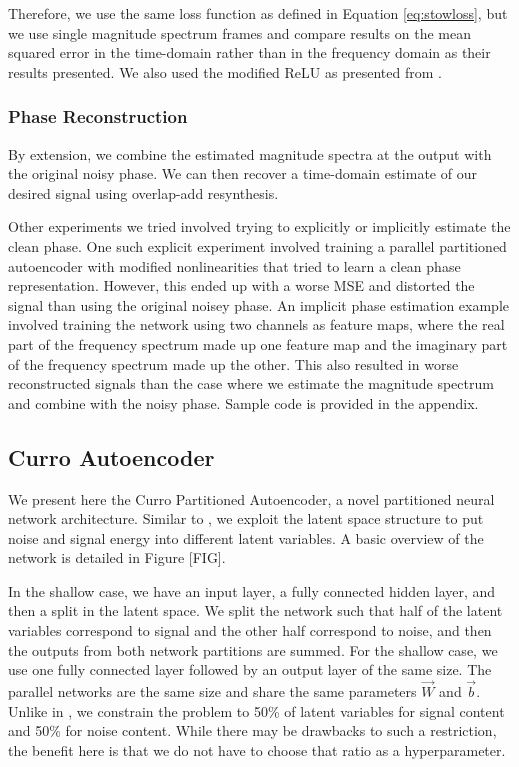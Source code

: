 Therefore, we use the same loss function as defined in Equation \ref{eq:stowloss}, but we use single magnitude spectrum frames and compare results on the mean squared error in the time-domain rather than in the frequency domain as their results presented. We also used the modified ReLU as presented from \cite{liu2014experiments}.

\subsubsection{Phase Reconstruction}

By extension, we combine the estimated magnitude spectra at the output with the original noisy phase. We can then recover a time-domain estimate of our desired signal using overlap-add resynthesis.

Other experiments we tried involved trying to explicitly or implicitly estimate the clean phase. One such explicit experiment involved training a parallel partitioned autoencoder with modified nonlinearities that tried to learn a clean phase representation. However, this ended up with a worse MSE and distorted the signal than using the original noisey phase. An implicit phase estimation example involved training the network using two channels as feature maps, where the real part of the frequency spectrum made up one feature map and the imaginary part of the frequency spectrum made up the other. This also resulted in worse reconstructed signals than the case where we estimate the magnitude spectrum and combine with the noisy phase. Sample code is provided in the appendix.

\subsection{Curro Autoencoder}

We present here the Curro Partitioned Autoencoder, a novel partitioned neural network architecture. Similar to \cite{stow}, we exploit the latent space structure to put noise and signal energy into different latent variables. A basic overview of the network is detailed in Figure [FIG].

In the shallow case, we have an input layer, a fully connected hidden layer, and then a split in the latent space. We split the network such that half of the latent variables correspond to signal and the other half correspond to noise, and then the outputs from both network partitions are summed. For the shallow case, we use one fully connected layer followed by an output layer of the same size. The parallel networks are the same size and share the same parameters $\vec{W}$ and $\vec{b}$. Unlike in \cite{stow}, we constrain the problem to 50\% of latent variables for signal content and 50\% for noise content. While there may be drawbacks to such a restriction, the benefit here is that we do not have to choose that ratio as a hyperparameter.

